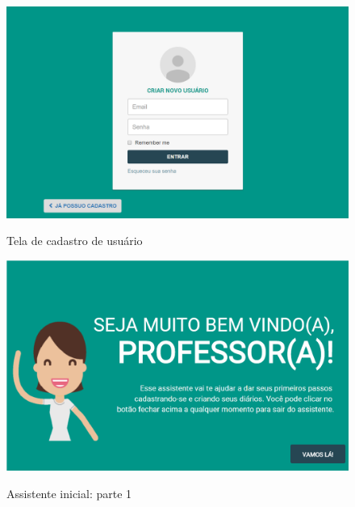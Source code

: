 \begin{figure}[!htb]
	\centering
	\caption{Tela de cadastro de usuário} %
	\includegraphics[scale=0.4]{cadastroTela}\\  %
	{\small } %
	\label{fig:cadastroTela} %
\end{figure}


\begin{figure}[!htb]
	\centering
	\caption{Assistente inicial: parte 1} %
	\includegraphics[scale=0.4]{assistenteInicialPT1}\\  %
	{\small } %
	\label{fig:assistenteInicialPT1} %
\end{figure}

